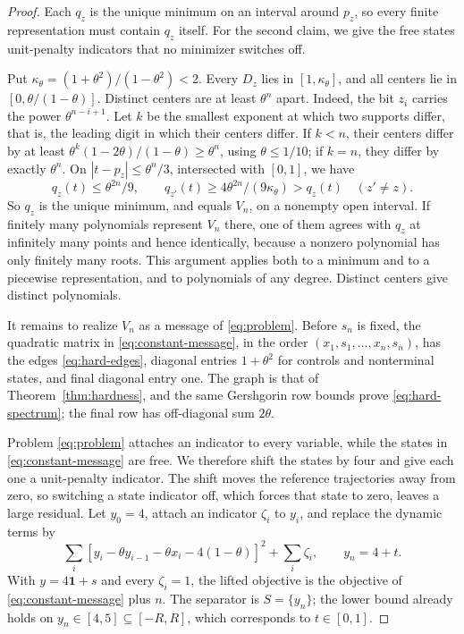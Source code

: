 \begin{proof}
Each $q_z$ is the unique minimum on an interval around $p_z$, so every
finite representation must contain $q_z$ itself. For the second claim,
we give the free states unit-penalty indicators that no minimizer
switches off.

Put $\kappa_\theta=(1+\theta^2)/(1-\theta^2)<2$. Every $D_z$ lies in
$[1,\kappa_\theta]$, and all centers lie in $[0,\theta/(1-\theta)]$.
Distinct centers are at least $\theta^n$ apart. Indeed, the bit $z_i$
carries the power $\theta^{n-i+1}$. Let $k$ be the smallest exponent at
which two supports differ, that is, the leading digit in which their
centers differ. If $k<n$, their centers differ by at least
$\theta^k(1-2\theta)/(1-\theta)\ge\theta^n$, using $\theta\le1/10$;
if $k=n$, they differ by exactly $\theta^n$. On $|t-p_z|\le\theta^n/3$,
intersected with $[0,1]$, we have
\[
 q_z(t)\le\theta^{2n}/9,
 \qquad q_{z'}(t)\ge4\theta^{2n}/(9\kappa_\theta)>q_z(t)
 \quad(z'\ne z).
\]
So $q_z$ is the unique minimum, and equals $V_n$, on a nonempty open
interval. If finitely many polynomials represent $V_n$ there, one of
them agrees with $q_z$ at infinitely many points and hence identically,
because a nonzero polynomial has only finitely many roots. This
argument applies both to a minimum and to a piecewise representation,
and to polynomials of any degree. Distinct centers give distinct
polynomials.

It remains to realize $V_n$ as a message of \eqref{eq:problem}. Before
$s_n$ is fixed, the quadratic matrix in \eqref{eq:constant-message}, in
the order $(x_1,s_1,\ldots,x_n,s_n)$, has the edges
\eqref{eq:hard-edges}, diagonal entries $1+\theta^2$ for controls and
nonterminal states, and final diagonal entry one. The graph is that of
Theorem~\ref{thm:hardness}, and the same Gershgorin row bounds prove
\eqref{eq:hard-spectrum}; the final row has off-diagonal sum $2\theta$.

Problem \eqref{eq:problem} attaches an indicator to every variable,
while the states in \eqref{eq:constant-message} are free. We therefore
shift the states by four and give each one a unit-penalty indicator.
The shift moves the reference trajectories away from zero, so switching
a state indicator off, which forces that state to zero, leaves a large
residual. Let $y_0=4$, attach an indicator $\zeta_i$ to $y_i$, and
replace the dynamic terms by
\begin{equation}\label{eq:message-lift}
 \sum_i[y_i-\theta y_{i-1}-\theta x_i-4(1-\theta)]^2
       +\sum_i\zeta_i,
 \qquad y_n=4+t.
\end{equation}
With $y=4\mathbf1+s$ and every $\zeta_i=1$, the lifted objective is the
objective of \eqref{eq:constant-message} plus $n$. The separator is
$S=\{y_n\}$; the lower bound already holds on
$y_n\in[4,5]\subseteq[-R,R]$, which corresponds to $t\in[0,1]$.


\end{proof}
